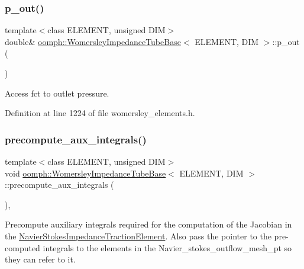 \subsubsection{\texorpdfstring{p\+\_\+out()}{p\_out()}}
{\footnotesize\ttfamily template$<$class E\+L\+E\+M\+E\+NT, unsigned D\+IM$>$ \\
double\& \hyperlink{classoomph_1_1WomersleyImpedanceTubeBase}{oomph\+::\+Womersley\+Impedance\+Tube\+Base}$<$ E\+L\+E\+M\+E\+NT, D\+IM $>$\+::p\+\_\+out (\begin{DoxyParamCaption}{ }\end{DoxyParamCaption})\hspace{0.3cm}{\ttfamily [inline]}}



Access fct to outlet pressure. 



Definition at line 1224 of file womersley\+\_\+elements.\+h.

\mbox{\label{classoomph_1_1WomersleyImpedanceTubeBase_a64f2f3eeb09a5637b32661baab3ac1e4}} 
\subsubsection{\texorpdfstring{precompute\+\_\+aux\+\_\+integrals()}{precompute\_aux\_integrals()}}
{\footnotesize\ttfamily template$<$class E\+L\+E\+M\+E\+NT, unsigned D\+IM$>$ \\
void \hyperlink{classoomph_1_1WomersleyImpedanceTubeBase}{oomph\+::\+Womersley\+Impedance\+Tube\+Base}$<$ E\+L\+E\+M\+E\+NT, D\+IM $>$\+::precompute\+\_\+aux\+\_\+integrals (\begin{DoxyParamCaption}{ }\end{DoxyParamCaption})\hspace{0.3cm}{\ttfamily [inline]}, {\ttfamily [protected]}}



Precompute auxiliary integrals required for the computation of the Jacobian in the \hyperlink{classoomph_1_1NavierStokesImpedanceTractionElement}{Navier\+Stokes\+Impedance\+Traction\+Element}. Also pass the pointer to the pre-\/computed integrals to the elements in the Navier\+\_\+stokes\+\_\+outflow\+\_\+mesh\+\_\+pt so they can refer to it. 



